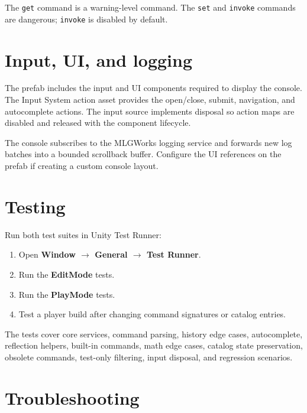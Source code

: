 \documentclass[11pt,a4paper]{article}
\begin{document}
The \texttt{get} command is a warning-level command. The \texttt{set} and \texttt{invoke} commands are dangerous; \texttt{invoke} is disabled by default.

\section{Input, UI, and logging}

The prefab includes the input and UI components required to display the console. The Input System action asset provides the open/close, submit, navigation, and autocomplete actions. The input source implements disposal so action maps are disabled and released with the component lifecycle.

The console subscribes to the MLGWorks logging service and forwards new log batches into a bounded scrollback buffer. Configure the UI references on the prefab if creating a custom console layout.

\section{Testing}

Run both test suites in Unity Test Runner:

\begin{enumerate}[leftmargin=*]
  \item Open \textbf{Window $\rightarrow$ General $\rightarrow$ Test Runner}.
  \item Run the \textbf{EditMode} tests.
  \item Run the \textbf{PlayMode} tests.
  \item Test a player build after changing command signatures or catalog entries.
\end{enumerate}

The tests cover core services, command parsing, history edge cases, autocomplete, reflection helpers, built-in commands, math edge cases, catalog state preservation, obsolete commands, test-only filtering, input disposal, and regression scenarios.

\section{Troubleshooting}
\end{document}

